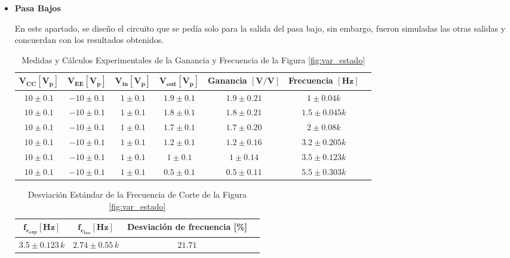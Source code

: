         \begin{itemize}
          \item \textbf{Pasa Bajos}
        
            En este apartado, se diseño el circuito que se pedía solo para la salida del pasa bajo, sin embargo, fueron simuladas las otras salidas y concuerdan con los resultados obtenidos.

            \begin{table}[H]
              \centering
              \begin{tabular}{|c|c|c|c|c|c|c|}
                \hline
                $\mathbf{V_{CC} [V_p]}$ & $\mathbf{V_{EE} [V_p]}$ & $\mathbf{V_{in} [V_p]}$ & $\mathbf{V_{out} [V_p]}$ & \textbf{Ganancia} $\mathbf{[V/V]}$ & \textbf{Frecuencia} $\mathbf{[Hz]}$ \\
                \hline
                $10 \pm 0.1$ & $-10 \pm 0.1$ & $1 \pm 0.1$ & $1.9 \pm 0.1$ & $1.9 \pm 0.21$ & $1 \pm 0.04 k$ \\
                \hline
                $10 \pm 0.1$ & $-10 \pm 0.1$ & $1 \pm 0.1$ & $1.8 \pm 0.1$ & $1.8 \pm 0.21$ & $1.5 \pm 0.045 k$ \\
                \hline
                $10 \pm 0.1$ & $-10 \pm 0.1$ & $1 \pm 0.1$ & $1.7 \pm 0.1 $ & $1.7 \pm 0.20$ & $2 \pm 0.08 k$ \\
                \hline
                $10 \pm 0.1$ & $-10 \pm 0.1$ & $1 \pm 0.1$ & $1.2 \pm 0.1$ & $1.2 \pm 0.16$ & $3.2 \pm 0.205 k$ \\
                \hline
                $10 \pm 0.1$ & $-10 \pm 0.1$ & $1 \pm 0.1$ & $1 \pm 0.1$ & $1 \pm 0.14$ & $3.5 \pm 0.123 k$ \\
                \hline
                $10 \pm 0.1$ & $-10 \pm 0.1$ & $1 \pm 0.1$ & $0.5 \pm 0.1$ & $0.5 \pm 0.11$ & $5.5 \pm 0.303 k$ \\
                \hline
              \end{tabular}
              \caption{Medidas y Cálculos Experimentales de la Ganancia y Frecuencia de la Figura \ref{fig:var_estado}}
              \label{tab:exp_var_estado}
            \end{table}

            \begin{table}[H]
              \centering
              \begin{tabular}{|c|c|c|c|}
                \hline
                $\mathbf{f_{c_{exp}} [Hz]}$ & $\mathbf{f_{c_{teo}} [Hz]}$ & \textbf{Desviación de frecuencia [\%]} \\
                \hline
                $3.5 \pm 0.123  \, k$ & $2.74 \pm 0.55 \, k$ & $21.71$ \\
                \hline
              \end{tabular}
              \caption{Desviación Estándar de la Frecuencia de Corte de la Figura \ref{fig:var_estado}}
              \label{tab:exp_var_estado_frecorte}
            \end{table}


\end{itemize}
